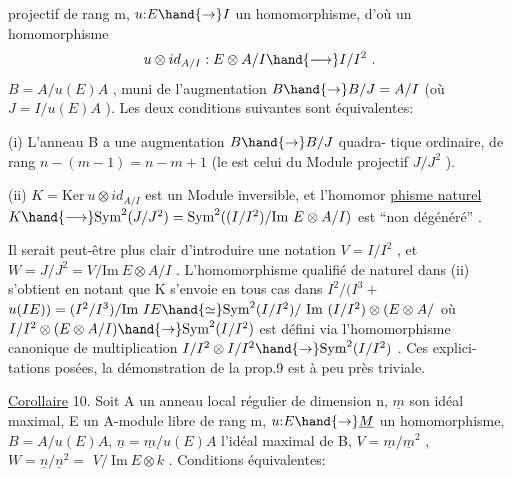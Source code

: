 \margin{\unsure{$\diagup$}}

projectif de rang m,  $u{:}E \hand{\to} I$ un homomorphisme, d'où un homomorphisme
\[ u\otimes id_{A/I} : E\otimes A/I \hand{\longrightarrow} I/I^2 \ . \]
  $B = A/u(E)A$ , muni de l'augmentation $B\hand{\to} B/J = A/I$
(où $J = I/u(E)A$ ). Les deux conditions suivantes sont équivalentes:

\margin{$\|$} (i) L'anneau  B  a une augmentation $B\hand{\to} B/J$  quadra-%
tique ordinaire, de rang $n-(m-1)= n-m+1$ (le 
est  celui du Module projectif $J/J^2$ ).

\margin{$|$} (ii) $K = \mathrm{Ker}\ u\otimes id_{A/I}$ est un Module inversible, et l'homomor
\uline{phisme naturel} $K \hand{\longrightarrow} \mathrm{Sym}^2(J/J^2) = \mathrm{Sym}^2( (I/I^2)/\mathrm{Im}\ E\otimes A/I )$ est
``non dégénéré'' .

Il serait peut-être plus clair d'introduire une notation $V = I/I^2$ ,
et $W = J/J^2 = V / \mathrm{Im}\ E\otimes A/I$ . L'homomorphisme qualifié de naturel
dans (ii) s'obtient en notant que K s'envoie en tous cas dans
\margin{$\|$} $I^2/(I^3 +$  $u(IE)) = (I^2/I^3)/\mathrm{Im}\ IE \hand{\simeq} \mathrm{Sym}^2(I/I^2)/\ \mathrm{Im}\ (I/I^2)\otimes(E\otimes A/$
où $I/I^2 \otimes(E \otimes A/I) \hand{\to} \mathrm{Sym}^2(I/I^2)$ est défini via l'homomorphisme
canonique de multiplication $I/I^2 \otimes I/I^2 \hand{\to} \mathrm{Sym}^2(I/I^2 )$ . Ces explici-%
tations posées, la démonstration de la prop.9 est à peu près triviale.

\margin{\unsure{$\diagup$}}
\uline{Corollaire} 10. Soit A un anneau local régulier de dimension n, $\underline{m}$ son
idéal maximal,  E un A-module libre de rang m, $u{:}E \hand{\to} \underline{M}$ un homomorphisme,
 $B = A/u(E)A$, $\underline{n} = \underline{m}/u(E)A$ l'idéal maximal de B,
$V = \underline{m}/\underline{m}^2$ , $W = \underline{n}/\underline{n}^2 =$  $V/\ \mathrm{Im}\ E\otimes k$ . Conditions équivalentes:

